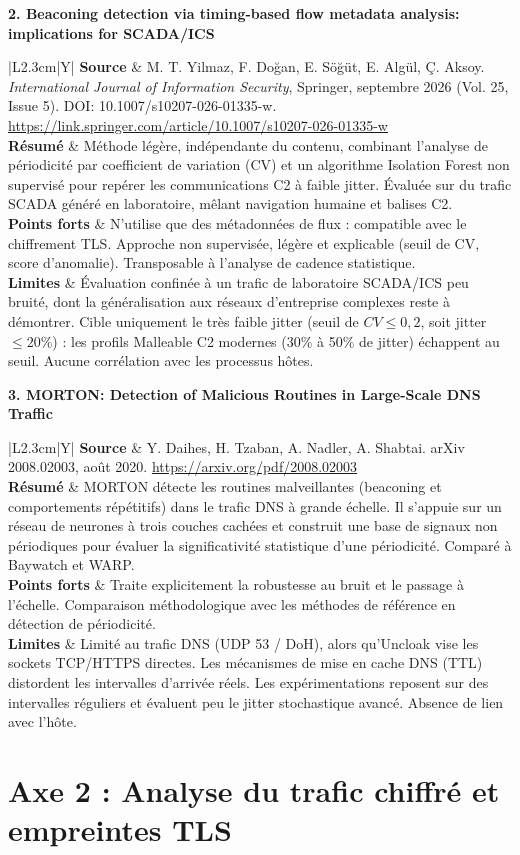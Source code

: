 \documentclass[10pt,a4paper]{article}
\newcommand{\articlecard}[5]{
    \noindent\textbf{#1}\par\vspace{1.2mm}
    \noindent\begin{tabularx}{\textwidth}{|L{2.3cm}|Y|}
        \hline
        \textbf{Source} & #2 \\ \hline
        \textbf{Résumé} & #3 \\ \hline
        \textbf{Points forts} & #4 \\ \hline
        \textbf{Limites} & #5 \\ \hline
    \end{tabularx}
    \vspace{3.5mm}
}
\begin{document}
\articlecard{2. Beaconing detection via timing-based flow metadata analysis: implications for SCADA/ICS}{
M. T. Yilmaz, F. Doğan, E. Söğüt, E. Algül, Ç. Aksoy. \textit{International Journal of Information Security}, Springer, septembre 2026 (Vol. 25, Issue 5). DOI: 10.1007/s10207-026-01335-w.\newline
\url{https://link.springer.com/article/10.1007/s10207-026-01335-w}
}{
Méthode légère, indépendante du contenu, combinant l'analyse de périodicité par coefficient de variation (CV) et un algorithme Isolation Forest non supervisé pour repérer les communications C2 à faible jitter. Évaluée sur du trafic SCADA généré en laboratoire, mêlant navigation humaine et balises C2.
}{
N'utilise que des métadonnées de flux : compatible avec le chiffrement TLS. Approche non supervisée, légère et explicable (seuil de CV, score d'anomalie). Transposable à l'analyse de cadence statistique.
}{
Évaluation confinée à un trafic de laboratoire SCADA/ICS peu bruité, dont la généralisation aux réseaux d'entreprise complexes reste à démontrer. Cible uniquement le très faible jitter (seuil de $CV \le 0,2$, soit jitter $\le 20\%$) : les profils Malleable C2 modernes (30\% à 50\% de jitter) échappent au seuil. Aucune corrélation avec les processus hôtes.
}

\articlecard{3. MORTON: Detection of Malicious Routines in Large-Scale DNS Traffic}{
Y. Daihes, H. Tzaban, A. Nadler, A. Shabtai. arXiv 2008.02003, août 2020.\newline
\url{https://arxiv.org/pdf/2008.02003}
}{
MORTON détecte les routines malveillantes (beaconing et comportements répétitifs) dans le trafic DNS à grande échelle. Il s'appuie sur un réseau de neurones à trois couches cachées et construit une base de signaux non périodiques pour évaluer la significativité statistique d'une périodicité. Comparé à Baywatch et WARP.
}{
Traite explicitement la robustesse au bruit et le passage à l'échelle. Comparaison méthodologique avec les méthodes de référence en détection de périodicité.
}{
Limité au trafic DNS (UDP 53 / DoH), alors qu'Uncloak vise les sockets TCP/HTTPS directes. Les mécanismes de mise en cache DNS (TTL) distordent les intervalles d'arrivée réels. Les expérimentations reposent sur des intervalles réguliers et évaluent peu le jitter stochastique avancé. Absence de lien avec l'hôte.
}

\newpage

\section*{Axe 2 : Analyse du trafic chiffré et empreintes TLS}
\end{document}
